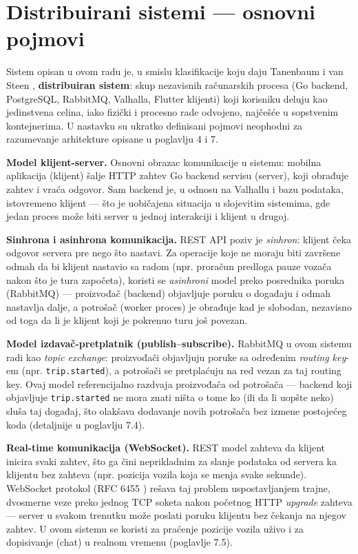 \section{Distribuirani sistemi — osnovni pojmovi}

Sistem opisan u ovom radu je, u smislu klasifikacije koju daju Tanenbaum i van Steen \cite{tanenbaum}, \textbf{distribuiran sistem}: skup nezavisnih računarskih procesa (Go backend, PostgreSQL, RabbitMQ, Valhalla, Flutter klijenti) koji korisniku deluju kao jedinstvena celina, iako fizički i procesno rade odvojeno, najčešće u sopstvenim kontejnerima. U nastavku su ukratko definisani pojmovi neophodni za razumevanje arhitekture opisane u poglavlju 4 i 7.

\textbf{Model klijent-server.} Osnovni obrazac komunikacije u sistemu: mobilna aplikacija (klijent) šalje HTTP zahtev Go backend servisu (server), koji obrađuje zahtev i vraća odgovor. Sam backend je, u odnosu na Valhallu i bazu podataka, istovremeno klijent — što je uobičajena situacija u slojevitim sistemima, gde jedan proces može biti server u jednoj interakciji i klijent u drugoj.

\textbf{Sinhrona i asinhrona komunikacija.} REST API poziv je \emph{sinhron}: klijent čeka odgovor servera pre nego što nastavi. Za operacije koje ne moraju biti završene odmah da bi klijent nastavio sa radom (npr. proračun predloga pauze vozača nakon što je tura započeta), koristi se \emph{asinhroni} model preko posrednika poruka (RabbitMQ) — proizvođač (backend) objavljuje poruku o događaju i odmah nastavlja dalje, a potrošač (worker proces) je obrađuje kad je slobodan, nezavisno od toga da li je klijent koji je pokrenuo turu još povezan.

\textbf{Model izdavač-pretplatnik (publish–subscribe).} RabbitMQ u ovom sistemu radi kao \emph{topic exchange}: proizvođači objavljuju poruke sa određenim \emph{routing key}-em (npr. \texttt{trip.started}), a potrošači se pretplaćuju na red vezan za taj routing key. Ovaj model referencijalno razdvaja proizvođača od potrošača — backend koji objavljuje \texttt{trip.started} ne mora znati ništa o tome ko (ili da li uopšte neko) sluša taj događaj, što olakšava dodavanje novih potrošača bez izmene postojećeg koda (detaljnije u poglavlju 7.4).

\textbf{Real-time komunikacija (WebSocket).} REST model zahteva da klijent inicira svaki zahtev, što ga čini neprikladnim za slanje podataka od servera ka klijentu bez zahteva (npr. pozicija vozila koja se menja svake sekunde). WebSocket protokol (RFC 6455 \cite{websocket}) rešava taj problem uspostavljanjem trajne, dvosmerne veze preko jednog TCP soketa nakon početnog HTTP \emph{upgrade} zahteva — server u svakom trenutku može poslati poruku klijentu bez čekanja na njegov zahtev. U ovom sistemu se koristi za praćenje pozicije vozila uživo i za dopisivanje (chat) u realnom vremenu (poglavlje 7.5).

